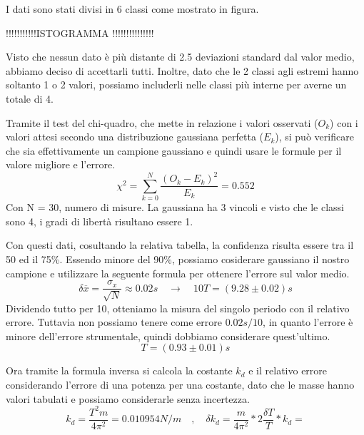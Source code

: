 \documentclass[12pt, a4paper]{article}
\begin{document}
I dati sono stati divisi in 6 classi come mostrato in figura. 

!!!!!!!!!!!ISTOGRAMMA !!!!!!!!!!!!!!!

Visto che nessun dato è più distante di 2.5 deviazioni standard dal valor medio, abbiamo deciso di accettarli tutti. Inoltre, dato che le 2 classi agli estremi hanno soltanto 1 o 2 valori, possiamo includerli nelle classi più interne per averne un totale di 4. 

Tramite il test del chi-quadro, che mette in relazione i valori osservati ($O_k$) con i valori attesi secondo una distribuzione gaussiana perfetta ($E_k$), si può verificare che sia effettivamente un campione gaussiano e quindi usare le formule per il valore migliore e l'errore.
\begin{equation*}
    \chi^2 = \sum_{k=0}^N \frac{(O_k - E_k)^2}{E_k} = 0.552
\end{equation*}
Con N = 30, numero di misure. La gaussiana ha 3 vincoli e visto che le classi sono 4, i gradi di libertà risultano essere 1.

Con questi dati, cosultando la relativa tabella, la confidenza risulta essere tra il 50 ed il 75\%. Essendo minore del 90\%, possiamo cosiderare gaussiano il nostro campione e utilizzare la seguente formula per ottenere l'errore sul valor medio. 
\begin{equation*}
    \delta \overline{x} = \frac{\sigma_x}{\sqrt{N}} \approx 0.02s \quad \xrightarrow{} \quad 10T = (9.28 \pm 0.02)s
\end{equation*}
Dividendo tutto per 10, otteniamo la misura del singolo periodo con il relativo errore. Tuttavia non possiamo tenere come errore $0.02s / 10$, in quanto l'errore è minore dell'errore strumentale, quindi dobbiamo considerare quest'ultimo. 
\begin{equation*}
    T = (0.93 \pm 0.01)s
\end{equation*}

Ora tramite la formula inversa si calcola la costante $k_d$ e il relativo errore considerando l'errore di una potenza per una costante, dato che le masse hanno valori tabulati e possiamo considerarle senza incertezza. 
\begin{equation*}
    k_d = \frac{T^2 m}{4\pi^2} = 0.010954N/m \quad , \quad \delta k_d = \frac{m}{4\pi^2} * 2 \frac{\delta T}{T} * k_d = 
\end{equation*}






\newpage
\end{document}
